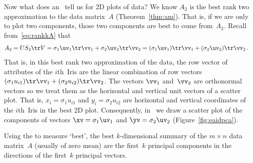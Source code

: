 Now what does an \svd\ tell us for 2D plots of data?  
We know \(A_2\) is the best rank two approximation to the data matrix~\(A\) (Theorem~\ref{thm:am}). 
That is, if we are only to plot two components, those two components are best to come from~\(A_2\).
Recall from~\eqref{eq:rankkA} that
\begin{equation*}
A_2=US_2\tr V =\sigma_1\uv_1\tr\vv_1 +\sigma_2\uv_2\tr\vv_2
=(\sigma_1\uv_1)\tr\vv_1 +(\sigma_2\uv_2)\tr\vv_2\,.
\end{equation*}
That is, in this best rank two approximation of the data, the row vector of attributes of the \(i\)th~Iris are the linear combination of row vectors \((\sigma_1u_{i1})\tr\vv_1+(\sigma_2u_{i2})\tr\vv_2\).
The vectors \(\vv_1\) and~\(\vv_2\) are orthonormal vectors so we treat them as the horizontal and vertical unit vectors of a scatter plot. 
That is, \(x_i=\sigma_1u_{i1}\) and \(y_i=\sigma_2u_{i2}\) are horizontal and vertical coordinates of the \(i\)th~Iris in the best 2D plot.
Consequently, in \script\ we draw a scatter plot of the components of vectors \(\xv=\sigma_1\uv_1\) and \(\yv=\sigma_2\uv_2\) (Figure~\ref{fig:eaidpca}).


\begin{theorem} \label{thm:}
Using the  to measure `best', the best \(k\)-dimensional summary of the \(m\times n\) data matrix~\(A\)  (usually of zero mean) are the first~\(k\) principal components in the directions of the first~\(k\) principal vectors.
\end{theorem}

